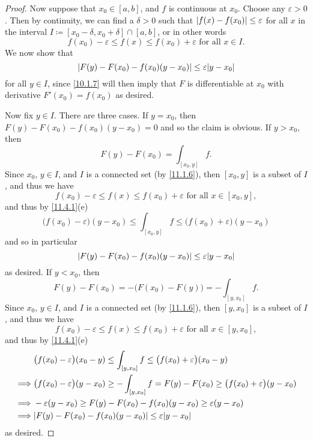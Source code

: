 \begin{proof}
  Now suppose that \(x_0 \in [a, b]\), and \(f\) is continuous at \(x_0\).
  Choose any \(\varepsilon > 0\).
  Then by continuity, we can find a \(\delta > 0\) such that \(\left\lvert f(x) - f(x_0)\right\rvert \leq \varepsilon\) for all \(x\) in the interval \(I \coloneqq [x_0 - \delta, x_0 + \delta] \cap [a, b]\), or in other words
  \[
    f(x_0) - \varepsilon \leq f(x) \leq f(x_0) + \varepsilon \text{ for all } x \in I.
  \]
  We now show that
  \[
    \abs{F(y) - F(x_0) - f(x_0)(y - x_0)} \leq \varepsilon \abs{y - x_0}
  \]
  for all \(y \in I\), since \cref{10.1.7} will then imply that \(F\) is differentiable at \(x_0\) with derivative \(F'(x_0) = f(x_0)\) as desired.

  Now fix \(y \in I\).
  There are three cases.
  If \(y = x_0\), then \(F(y) - F(x_0) - f(x_0)(y - x_0) = 0\) and so the claim is obvious.
  If \(y > x_0\), then
  \[
    F(y) - F(x_0) = \int_{[x_0, y]} f.
  \]
  Since \(x_0\), \(y \in I\), and \(I\) is a connected set (by \cref{11.1.6}), then \([x_0, y]\) is a subset of \(I\), and thus we have
  \[
    f(x_0) - \varepsilon \leq f(x) \leq f(x_0) + \varepsilon \text{ for all } x \in [x_0, y],
  \]
  and thus by \cref{11.4.1}(e)
  \[
    \big(f(x_0) - \varepsilon\big) (y - x_0) \leq \int_{[x_0, y]} f \leq \big(f(x_0) + \varepsilon\big) (y - x_0)
  \]
  and so in particular
  \[
    \abs{F(y) - F(x_0) - f(x_0)(y - x_0)} \leq \varepsilon \abs{y - x_0}
  \]
  as desired.
  If \(y < x_0\), then
  \[
    F(y) - F(x_0) = -\big(F(x_0) - F(y)\big) = -\int_{[y, x_0]} f.
  \]
  Since \(x_0\), \(y \in I\), and \(I\) is a connected set (by \cref{11.1.6}), then \([y, x_0]\) is a subset of \(I\), and thus we have
  \[
    f(x_0) - \varepsilon \leq f(x) \leq f(x_0) + \varepsilon \text{ for all } x \in [y, x_0],
  \]
  and thus by \cref{11.4.1}(e)
  \begin{align*}
             & \big(f(x_0) - \varepsilon\big) (x_0 - y) \leq \int_{[y, x_0]} f \leq \big(f(x_0) + \varepsilon\big) (x_0 - y)                  \\
    \implies & \big(f(x_0) - \varepsilon\big) (y - x_0) \geq -\int_{[y, x_0]} f = F(y) - F(x_0) \geq \big(f(x_0) + \varepsilon\big) (y - x_0) \\
    \implies & -\varepsilon (y - x_0) \geq F(y) - F(x_0) - f(x_0)(y - x_0) \geq \varepsilon (y - x_0)                                         \\
    \implies & \abs{F(y) - F(x_0) - f(x_0)(y - x_0)} \leq \varepsilon \abs{y - x_0}
  \end{align*}
  as desired.
\end{proof}

